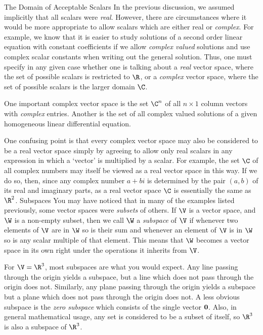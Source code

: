 \medskip
\subhead The Domain of Acceptable Scalars \endsubhead    In the
previous discussion,  we assumed
implicitly that all scalars were {\it real}.   However, there are
circumstances where it would be more appropriate to allow scalars
which are either real or {\it complex}.  For example, we know that
it is easier to study solutions of a second order linear equation
with constant coefficients if we allow {\it complex valued\/}
solutions and use complex scalar constants when writing out the
general solution.   Thus, one must specify in any given case
whether one is talking about a {\it real\/} vector space, where
the set of possible scalars is restricted to $\R$, or a 
{\it complex\/} vector space, where the set of possible
scalars is the larger domain $\C$. 
%
%

One important complex vector space is the set $\C^n$ of all
$n\times 1$ column vectors with {\it complex\/} entries.
Another is the set of all complex valued solutions of a given
homogeneous linear differential equation.
%

One confusing point is that every complex vector space may also
be considered to be a real vector space simply by agreeing to
allow only real scalars in any expression in which a `vector'
is multiplied by a scalar.  For example, the set $\C$ of all
complex numbers may itself be viewed as a real vector
space in this way.  If we do so, then, since any complex number
$a + bi$ is determined by the pair $(a,b)$ of its real and
imaginary parts, as a real vector space $\C$ is essentially
the same as $\R^2$.
\medskip
\subhead Subspaces \endsubhead   You may have noticed that in
many of the examples listed previously, some vector spaces
were {\it subsets\/} of others.   If $\V$ is a vector space,
and $\W$ is a non-empty subset, then we call $\W$
a {\it subspace\/} of $\V$ if whenever two elements of $\V$
%
are in $\W$ so is their sum and whenever an element of $\V$
is in $\W$ so is any scalar multiple of that element.   This  
means that $\W$ becomes a vector space in its own right under
the operations it inherits from $\V$.

For $\V = \R^3$, most subspaces are what you would expect.
Any line passing through the origin yields a subspace, but a
line which does not pass through the origin does not.
Similarly, any plane passing through the origin yields a subspace
but a plane which does not pass through the origin does not.
A less obvious subspace is the {\it zero subspace\/}
which consists of the single vector $\bold 0$.   Also, in
general mathematical usage, any set is considered to be
a subset of itself, so $\R^3$ is also a subspace of $\R^3$.

